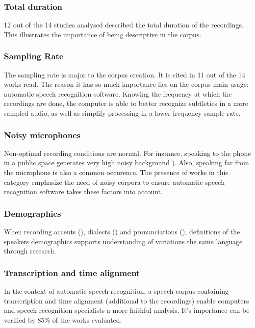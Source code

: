 \documentclass[conference]{IEEEtran}
\begin{document}
\subsubsection{Total duration}

12 out of the 14 studies analysed described the total duration of the recordings. This illustrates the importance of being descriptive in the corpus.

\subsubsection{Sampling Rate}

The sampling rate is major to the corpus creation. It is cited in 11 out of the 14 works read. The reason it has so much importance lies on the corpus main usage: automatic speech recognition software. Knowing the frequency at which the recordings are done, the computer is able to better recognize subtleties in a more sampled audio, as well as simplify processing in a lower frequency sample rate.

\subsubsection{Noisy microphones}

Non-optimal recording conditions are normal. For instance, speaking to the phone in a public space generates very high noisy background \cite{moore2017sheffield}). Also, speaking far from the microphone is also a common occurence. The presence of works in this category emphasize the need of noisy corpora to ensure automatic speech recognition software takes these factors into account.

\subsubsection{Demographics}

When recording accents (\cite{moore2017sheffield}), dialects (\cite{almeman2018building}) and pronunciations (\cite{ng2017shefce}),  definitions of the speakers demographics supports understanding of variations the same language through research.

\subsubsection{Transcription and time alignment}

In the context of automatic speech recognition, a speech corpus containing  transcription and time alignment (additional to the recordings) enable computers and speech recognition specialists a more faithful analysis. It's importance can be verified by 85\% of the works evaluated.
\end{document}
